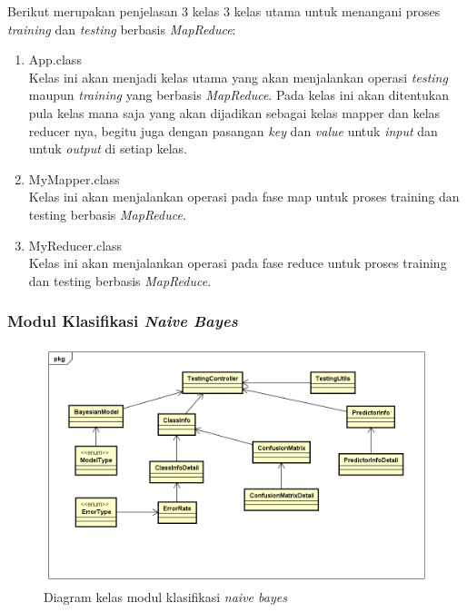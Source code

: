 Berikut merupakan penjelasan 3 kelas 3 kelas utama untuk menangani proses \textit{training} dan \textit{testing} berbasis \textit{MapReduce}:

\begin{enumerate}
\item{App.class} \\
Kelas ini akan menjadi kelas utama yang akan menjalankan operasi \textit{testing} maupun \textit{training} yang berbasis \textit{MapReduce}. Pada kelas ini akan ditentukan pula kelas mana saja yang akan dijadikan sebagai kelas mapper dan kelas reducer nya, begitu juga dengan pasangan \textit{key} dan \textit{value} untuk \textit{input} dan untuk \textit{output} di setiap kelas.
\item{MyMapper.class} \\
Kelas ini akan menjalankan operasi pada fase map untuk proses training dan testing berbasis \textit{MapReduce}.
\item{MyReducer.class} \\
Kelas ini akan menjalankan operasi pada fase reduce untuk proses training dan testing berbasis \textit{MapReduce}.
\end{enumerate}

\subsubsection{Modul Klasifikasi \textit{Naive Bayes}}
\begin{figure}[H]
	\centering
	\includegraphics[scale=0.65]{ClassDiagram/Simple_CD_Klasifikasi}
	\caption[Diagram kelas modul klasifikasi \textit{naive bayes}]{Diagram kelas modul klasifikasi \textit{naive bayes}}
	\label{fig:Diagram kelas modul klasifikasi naive bayes}
\end{figure}

